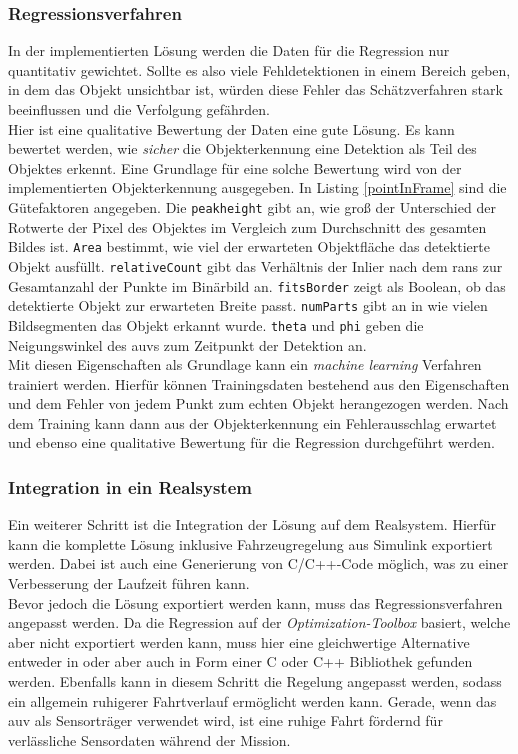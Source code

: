 \subsubsection{Regressionsverfahren}
\label{sec_learnWeights}
In der implementierten Lösung werden die Daten für die Regression nur quantitativ gewichtet. Sollte es also viele Fehldetektionen in einem Bereich geben, in dem das Objekt unsichtbar ist, würden diese Fehler das Schätzverfahren stark beeinflussen und die Verfolgung gefährden.\\
Hier ist eine qualitative Bewertung der Daten eine gute Lösung. Es kann bewertet werden, wie \textit{sicher} die Objekterkennung eine Detektion als Teil des Objektes erkennt. Eine Grundlage für eine solche Bewertung wird von der implementierten Objekterkennung ausgegeben. In Listing \ref{pointInFrame} sind die Gütefaktoren angegeben. Die \texttt{peakheight} gibt an, wie groß der Unterschied der Rotwerte der Pixel des Objektes im Vergleich zum Durchschnitt des gesamten Bildes ist. \texttt{Area} bestimmt, wie viel der erwarteten Objektfläche das detektierte Objekt ausfüllt. \texttt{relativeCount} gibt das Verhältnis der Inlier nach dem \gls{rans} zur Gesamtanzahl der Punkte im Binärbild an. \texttt{fitsBorder} zeigt als Boolean, ob das detektierte Objekt zur erwarteten Breite passt. \texttt{numParts} gibt an in wie vielen Bildsegmenten das Objekt erkannt wurde. \texttt{theta} und \texttt{phi} geben die Neigungswinkel des \gls{auv}s zum Zeitpunkt der Detektion an.\\
Mit diesen Eigenschaften als Grundlage kann ein \textit{machine learning} Verfahren trainiert werden. Hierfür können Trainingsdaten bestehend aus den Eigenschaften und dem Fehler von jedem Punkt zum echten Objekt herangezogen werden. Nach dem Training kann dann aus der Objekterkennung ein Fehlerausschlag erwartet und ebenso eine qualitative Bewertung für die Regression durchgeführt werden. 

\subsubsection{Integration in ein Realsystem}
\label{sec_real}
Ein weiterer Schritt ist die Integration der Lösung auf dem Realsystem. Hierfür kann die komplette Lösung inklusive Fahrzeugregelung aus Simulink exportiert werden. Dabei ist auch eine Generierung von C/C++-Code möglich, was zu einer Verbesserung der Laufzeit führen kann.\\
Bevor jedoch die Lösung exportiert werden kann, muss das Regressionsverfahren angepasst werden. Da die Regression auf der \textit{Optimization-Toolbox} basiert, welche aber nicht exportiert werden kann, muss hier eine gleichwertige Alternative entweder in \matlab oder aber auch in Form einer C oder C++ Bibliothek gefunden werden.
Ebenfalls kann in diesem Schritt die Regelung angepasst werden, sodass ein allgemein ruhigerer Fahrtverlauf ermöglicht werden kann. Gerade, wenn das \gls{auv} als Sensorträger verwendet wird, ist eine ruhige Fahrt fördernd für verlässliche Sensordaten während der Mission.
\cleardoublepage